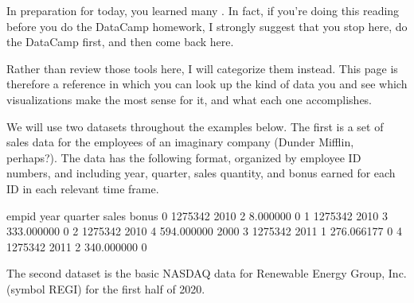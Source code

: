 \documentclass[letterpaper,10pt,english]{sphinxmanual}
\begin{document}
In preparation for today, you learned many .  In fact, if you’re doing this reading before you do the DataCamp homework, I strongly suggest that you stop here, do the DataCamp first, and then come back here.

Rather than review those tools here, I will categorize them instead.  This page is therefore a reference in which you can look up the kind of data you  and see which visualizations make the most sense for it, and what each one accomplishes.

We will use two datasets throughout the examples below.  The first is a set of sales data for the employees of an imaginary company (Dunder Mifflin, perhaps?).  The data has the following format, organized by employee ID numbers, and including year, quarter, sales quantity, and bonus earned for each ID in each relevant time frame.

\begin{sphinxVerbatim}[commandchars=\\\{\}]
   
    
\end{sphinxVerbatim}

\begin{sphinxVerbatim}[commandchars=\\\{\}]
    emp\PYGZus{}id  year  quarter       sales  bonus
0  1275342  2010        2    8.000000      0
1  1275342  2010        3  333.000000      0
2  1275342  2010        4  594.000000   2000
3  1275342  2011        1  276.066177      0
4  1275342  2011        2  340.000000      0
\end{sphinxVerbatim}

The second dataset is the basic NASDAQ data for Renewable Energy Group, Inc. (symbol REGI) for the first half of 2020.

\begin{sphinxVerbatim}[commandchars=\\\{\}]
    
\end{sphinxVerbatim}
\end{document}
